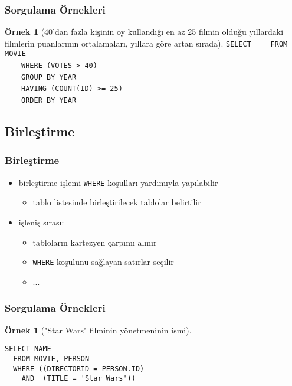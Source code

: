 \documentclass[dvipsnames]{beamer}
\theoremstyle{definition}
\theoremstyle{example}
\newtheorem{ornek}[theorem]{Örnek}
\theoremstyle{plain}
\begin{document}
\begin{frame}[fragile]
  \frametitle{Sorgulama Örnekleri}

  \begin{ornek}[40'dan fazla kişinin oy kullandığı en az 25 filmin olduğu
                yıllardaki filmlerin puanlarının ortalamaları, yıllara göre
                artan sırada]
\lstinline!SELECT! 
~~~~\lstinline!FROM MOVIE!\\
\pause
~~~~\lstinline!WHERE (VOTES > 40)!\\
\pause
~~~~\lstinline!GROUP BY YEAR!\\
\pause
~~~~\lstinline!HAVING (COUNT(ID) >= 25)!\\
\pause\pause
~~~~\lstinline!ORDER BY YEAR!
  \end{ornek}
\end{frame}

\subsection{Birleştirme}

\begin{frame}
  \frametitle{Birleştirme}

  \begin{itemize}
    \item birleştirme işlemi \lstinline!WHERE! koşulları yardımıyla yapılabilir
    \begin{itemize}
      \item tablo listesinde birleştirilecek tablolar belirtilir
    \end{itemize}

    \pause
    \item işleniş sırası:
    \begin{itemize}
      \item tabloların kartezyen çarpımı alınır
      \item \lstinline!WHERE! koşulunu sağlayan satırlar seçilir
      \item ...
    \end{itemize}
  \end{itemize}
\end{frame}

\begin{frame}[fragile]
  \frametitle{Sorgulama Örnekleri}

  \begin{ornek}["Star Wars" filminin yönetmeninin ismi]
    \begin{lstlisting}
SELECT NAME
  FROM MOVIE, PERSON
  WHERE ((DIRECTORID = PERSON.ID)
    AND  (TITLE = 'Star Wars'))
    \end{lstlisting}
  \end{ornek}
\end{frame}
\end{document}
